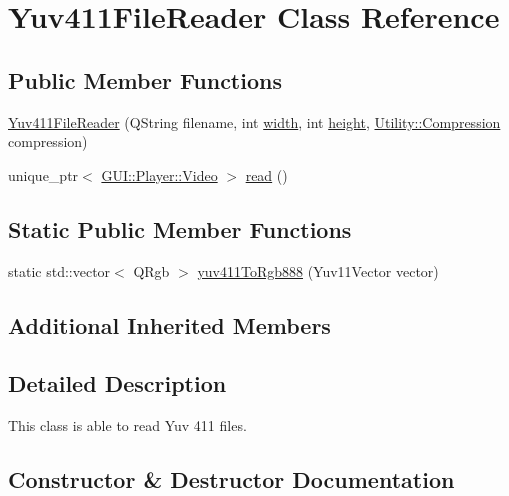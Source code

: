 \hypertarget{classUtility_1_1Yuv411FileReader}{}\section{Yuv411\+File\+Reader Class Reference}
\label{classUtility_1_1Yuv411FileReader}
\subsection*{Public Member Functions}
\begin{DoxyCompactItemize}
\item 
\hyperlink{classUtility_1_1Yuv411FileReader_af4e7eb4bd4929f14e6334ae7ac9dad6f}{Yuv411\+File\+Reader} (Q\+String filename, int \hyperlink{classUtility_1_1YuvFileReader_a2474a5474cbff19523a51eb1de01cda4}{width}, int \hyperlink{classUtility_1_1YuvFileReader_ad12fc34ce789bce6c8a05d8a17138534}{height}, \hyperlink{namespaceUtility_a56a83bf6847f4801f4205eb4be237ccf}{Utility\+::\+Compression} compression)
\item 
unique\+\_\+ptr$<$ \hyperlink{classGUI_1_1Player_1_1Video}{G\+U\+I\+::\+Player\+::\+Video} $>$ \hyperlink{classUtility_1_1Yuv411FileReader_a9dd03728ebb2e883f5cac8cb357fcd0e}{read} ()
\end{DoxyCompactItemize}
\subsection*{Static Public Member Functions}
\begin{DoxyCompactItemize}
\item 
static std\+::vector$<$ Q\+Rgb $>$ \hyperlink{classUtility_1_1Yuv411FileReader_af6d2712d6e14bd1bb6cd0b7658ad71fb}{yuv411\+To\+Rgb888} (Yuv11\+Vector vector)
\end{DoxyCompactItemize}
\subsection*{Additional Inherited Members}


\subsection{Detailed Description}
This class is able to read Yuv 411 files. 

\subsection{Constructor \& Destructor Documentation}
\hypertarget{classUtility_1_1Yuv411FileReader_af4e7eb4bd4929f14e6334ae7ac9dad6f}{}
